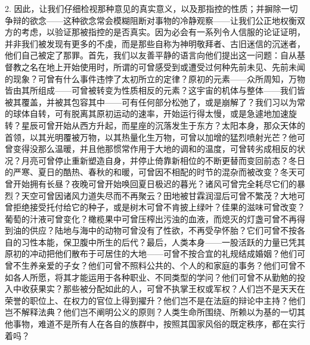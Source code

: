 2. 因此，让我们仔细检视那种意见的真实意义，以及那指控的性质；并摒除一切争辩的欲念——这种欲念常会模糊阻断对事物的冷静观察——让我们公正地权衡双方的考虑，以验证那被指控的是否真实。因为必会有一系列令人信服的论证证明，并非我们被发现有更多的不虔，而是那些自称为神明敬拜者、古旧迷信的沉迷者，他们自己被定了那罪。首先，我们以友善平静的语言向他们提出这一问题：自从基督教之名在地上开始使用时，所谓的可曾感受到或遭受过何种先前未见、先前未闻的现象？可曾有什么事件违悖了太初所立的定律？原初的元素——众所周知，万物皆由其所组成——可曾被转变为性质相反的元素？这宇宙的机体与整体——我们皆被其覆盖，并被其包容其中——可有任何部分松弛了，或是崩解了？我们习以为常的球体自转，可有脱离其原初运动的速率，开始运行得太慢，或是急遽地加速旋转？星辰可曾开始从西方升起，而星座的沉落发生于东方？太阳本身，那众天体的首领，以其光明覆被万物，以其热量化生万物，可曾以加增的猛烈喷射光芒？他可曾变得没那么温暖，并且他那惯常作用于大地的调和的温度，可曾转劣成相反的状况？月亮可曾停止重新塑造自身，并停止倚靠新相位的不断更替而变回前态？冬日的严寒、夏日的酷热、春秋的和暖，可曾因不相配的时节的混杂而被改变？冬天可曾开始拥有长昼？夜晚可曾开始唤回夏日极迟的暮光？诸风可曾完全耗尽它们的暴烈？天空可曾因诸风力道失尽而不再聚云？田地被甘霖润湿后可曾不繁茂？大地可曾拒绝接受托付给它的种子，或是树木可曾不肯披上绿叶？佳果的滋味可曾改变？葡萄的汁液可曾变化？橄榄果中可曾压榨出污浊的血液，而熄灭的灯盏可曾不再得到油的供应？陆地与海中的动物可曾没有了性欲，不再受孕怀胎？它们可曾不按各自的习性本能，保卫腹中所生的后代？最后，人类本身——一股活跃的力量已凭其原初的冲动把他们散布于可居住的大地——可曾不按合宜的礼规结成婚姻？他们可曾不生养亲爱的子女？他们可曾不照料公共的、个人的和家庭的事务？他们可曾不如各人所愿，将其才能运用于各种职业、不同类型的学问？他们可曾不从勤勉的投入中收获果实？那些被分配如此的人，可曾不执掌王权或军权？人们岂不是天天在荣誉的职位上、在权力的官位上得到擢升？他们岂不是在法庭的辩论中主持？他们岂不解释法典？他们岂不阐明公义的原则？人类生命所围绕、所赖以为基的一切其他事物，难道不是所有人在各自的族群中，按照其国家风俗的既定秩序，都在实行着吗？\par

